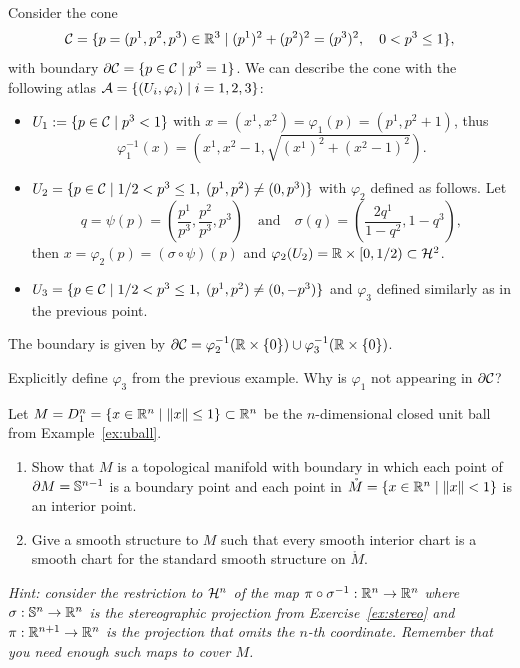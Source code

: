 \begin{example}
	Consider the cone
	\begin{equation}
		\mathcal{C} = \{p=(p^1,p^2,p^3)\in\mathbb{R}^3 \mid (p^1)^2 + (p^2)^2 = (p^3)^2, \quad 0< p^3\leq 1\},
	\end{equation}
	with boundary $\partial\mathcal{C} = \{p\in\mathcal{C} \mid p^3 = 1\}$.
	We can describe the cone with the following atlas $\mathcal{A} = \{(U_i,\varphi_i)\mid i=1,2,3\}$:
	\begin{itemize}
		\item $U_1 := \{p\in\mathcal{C}\mid p^3 < 1\}$ with $x = (x^1, x^2) = \varphi_1(p) = (p^1,p^2+1)$, thus
		      \begin{equation}
			      \varphi_1^{-1}(x) = \left(x^1, x^2-1, \sqrt{(x^1)^2 + (x^2-1)^2}\right).
		      \end{equation}
		\item $U_2 = \{p\in\mathcal{C}\mid 1/2 < p^3 \leq 1, \; (p^1, p^2) \neq (0, p^3)\}$ with $\varphi_2$ defined as follows. Let
		      \begin{equation}
			      q = \psi(p) = \left(\frac{p^1}{p^3}, \frac{p^2}{p^3}, p^3\right)
			      \quad\mbox{and}\quad
			      \sigma(q) = \left(\frac{2q^1}{1-q^2}, 1-q^3\right),
		      \end{equation}
		      then $x = \varphi_2(p) = (\sigma\circ\psi)(p)$ and $\varphi_2(U_2) = \mathbb{R}\times[0,1/2) \subset\mathcal{H}^2$.
		\item $U_3 = \{p\in\mathcal{C}\mid 1/2 < p^3 \leq 1, \; (p^1, p^2) \neq (0, -p^3) \}$ and $\varphi_3$ defined similarly as in the previous point.
	\end{itemize}
	The boundary is given by $\partial\mathcal{C} = \varphi_2^{-1}(\mathbb{R}\times\{0\}) \cup \varphi_3^{-1}(\mathbb{R}\times\{0\})$.
\end{example}

\begin{exercise}
	Explicitly define $\varphi_3$ from the previous example.
	Why is $\varphi_1$ not appearing in $\partial \mathcal{C}$?
\end{exercise}

\begin{exercise}
	Let $M = D_1^n = \{ x\in\mathbb{R}^n \mid \|x\|\leq 1\} \subset \mathbb{R}^n$ be the $n$-dimensional closed unit ball from Example~\ref{ex:uball}.
	\begin{enumerate}
		\item Show that $M$ is a topological manifold with boundary in which each point of $\partial M = \mathbb{S}^{n-1}$ is a boundary point and each point in $\mathring M = \{x\in\mathbb{R}^n\mid\|x\|<1\}$ is an interior point.
		\item Give a smooth structure to $M$ such that every smooth interior chart is a smooth chart for the standard smooth structure on $\mathring M$.
	\end{enumerate}
	\textit{\small Hint: consider the restriction to $\mathcal{H}^n$ of the map $\pi\circ\sigma^{-1}:\mathbb{R}^n\to\mathbb{R}^n$ where $\sigma:\mathbb{S}^n\to\mathbb{R}^n$ is the stereographic projection from Exercise~\ref{ex:stereo} and $\pi:\mathbb{R}^{n+1}\to\mathbb{R}^n$ is the projection that omits the $n$-th coordinate.
	Remember that you need enough such maps to cover $M$.}
\end{exercise}

